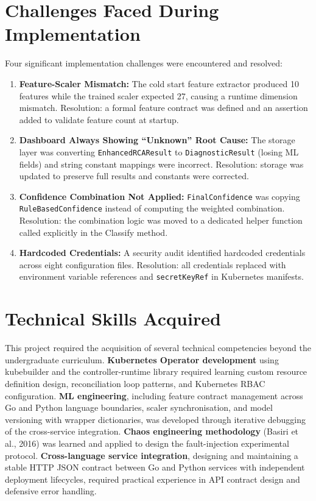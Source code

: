 \section{Challenges Faced During Implementation}
Four significant implementation challenges were encountered and resolved:

\begin{enumerate}
    \item \textbf{Feature-Scaler Mismatch:} The cold start feature extractor produced 10 features while the trained scaler expected 27, causing a runtime dimension mismatch. Resolution: a formal feature contract was defined and an assertion added to validate feature count at startup.

    \item \textbf{Dashboard Always Showing ``Unknown'' Root Cause:} The storage layer was converting \texttt{EnhancedRCAResult} to \texttt{DiagnosticResult} (losing ML fields) and string constant mappings were incorrect. Resolution: storage was updated to preserve full results and constants were corrected.

    \item \textbf{Confidence Combination Not Applied:} \texttt{FinalConfidence} was copying \texttt{RuleBasedConfidence} instead of computing the weighted combination. Resolution: the combination logic was moved to a dedicated helper function called explicitly in the Classify method.

    \item \textbf{Hardcoded Credentials:} A security audit identified hardcoded credentials across eight configuration files. Resolution: all credentials replaced with environment variable references and \texttt{secretKeyRef} in Kubernetes manifests.
\end{enumerate}

\section{Technical Skills Acquired}
This project required the acquisition of several technical competencies beyond the undergraduate curriculum. \textbf{Kubernetes Operator development} using kubebuilder and the controller-runtime library required learning custom resource definition design, reconciliation loop patterns, and Kubernetes RBAC configuration. \textbf{ML engineering}, including feature contract management across Go and Python language boundaries, scaler synchronisation, and model versioning with wrapper dictionaries, was developed through iterative debugging of the cross-service integration. \textbf{Chaos engineering methodology} (Basiri et al., 2016) was learned and applied to design the fault-injection experimental protocol. \textbf{Cross-language service integration}, designing and maintaining a stable HTTP JSON contract between Go and Python services with independent deployment lifecycles, required practical experience in API contract design and defensive error handling.


